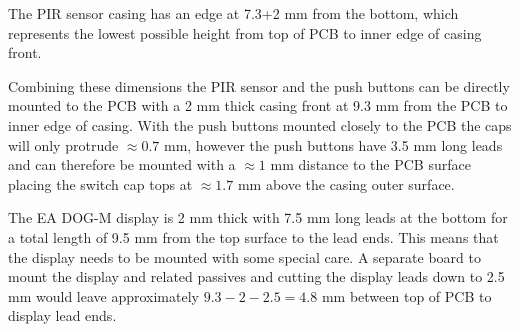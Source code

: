 The PIR sensor casing has an edge at 7.3+2 mm from the bottom, which
represents the lowest possible height from top of PCB to inner edge of
casing front.

Combining these dimensions the PIR sensor and the push buttons can be
directly mounted to the PCB with a 2 mm thick casing front at 9.3 mm
from the PCB to inner edge of casing. With the push buttons mounted
closely to the PCB the caps will only protrude $\approx 0.7$ mm,
however the push buttons have 3.5 mm long leads and can therefore be
mounted with a $\approx 1$ mm distance to the PCB surface placing the
switch cap tops at $\approx 1.7$ mm above the casing outer surface.

The EA DOG-M display is 2 mm thick with 7.5 mm long leads at the
bottom for a total length of 9.5 mm from the top surface to the lead
ends. This means that the display needs to be mounted with some
special care. A separate board to mount the display and related
passives and cutting the display leads down to 2.5 mm would leave
approximately $9.3-2-2.5=4.8$ mm between top of PCB to display lead
ends.
